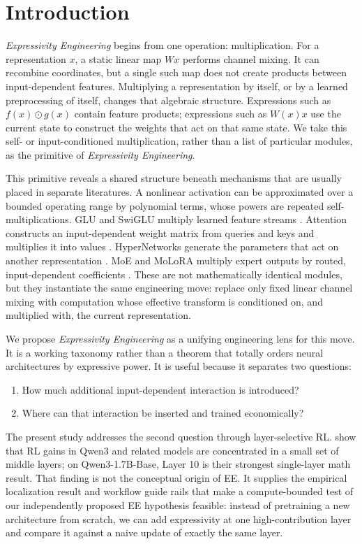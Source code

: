 \documentclass[10pt]{article}
\newcommand{\EE}{\textit{Expressivity Engineering}}
\begin{document}
\section{Introduction}

\EE{} begins from one operation: multiplication.  For a representation $x$, a
static linear map $Wx$ performs channel mixing.  It can recombine coordinates,
but a single such map does not create products between input-dependent
features.  Multiplying a representation by itself, or by a learned
preprocessing of itself, changes that algebraic structure.  Expressions such
as $f(x)\odot g(x)$ contain feature products; expressions such as $W(x)x$ use
the current state to construct the weights that act on that same state.  We
take this self- or input-conditioned multiplication, rather than a list of
particular modules, as the primitive of \EE{}.

This primitive reveals a shared structure beneath mechanisms that are usually
placed in separate literatures.  A nonlinear activation can be approximated
over a bounded operating range by polynomial terms, whose powers are repeated
self-multiplications.  GLU and SwiGLU multiply learned feature streams
\citep{shazeer2020glu}.  Attention constructs an input-dependent weight matrix
from queries and keys and multiplies it into values
\citep{vaswani2017attention}.  HyperNetworks generate the parameters that act
on another representation \citep{ha2016hypernetworks}.  MoE and MoLoRA multiply
expert outputs by routed, input-dependent coefficients
\citep{shazeer2017moe,zadouri2024molora}.  These are not mathematically
identical modules, but they instantiate the same engineering move: replace
only fixed linear channel mixing with computation whose effective transform is
conditioned on, and multiplied with, the current representation.

We propose \EE{} as a unifying engineering lens for this move.  It is a working
taxonomy rather than a theorem that totally orders neural architectures by
expressive power.  It is useful because it separates two questions:

\begin{enumerate}
  \item How much additional input-dependent interaction is introduced?
  \item Where can that interaction be inserted and trained economically?
\end{enumerate}

The present study addresses the second question through layer-selective RL.
\citet{zhang2026onelayer} show that RL gains in Qwen3 and related models are
concentrated in a small set of middle layers; on Qwen3-1.7B-Base, Layer 10 is
their strongest single-layer math result.  That finding is not the conceptual
origin of EE.  It supplies the empirical localization result and workflow
guide rails that make a compute-bounded test of our independently proposed EE
hypothesis feasible: instead of pretraining a new architecture from scratch,
we can add expressivity at one high-contribution layer and compare it against a
naive update of exactly the same layer.
\end{document}
